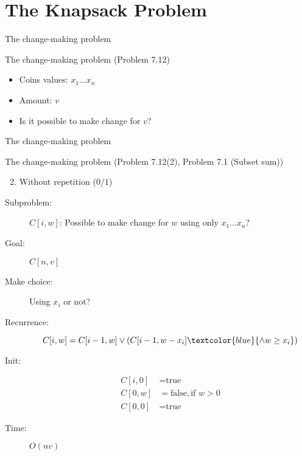 \section{The Knapsack Problem}

\begin{frame}{The change-making problem}
  \begin{exampleblock}{The change-making problem (Problem 7.12)}
    \begin{itemize}
      \item Coins values: $x_{1} \dots x_{n}$
      \item Amount: $v$
      \item Is it possible to make change for $v$?
    \end{itemize}
  \end{exampleblock}
\end{frame}
\begin{frame}{The change-making problem}
  \begin{exampleblock}{The change-making problem (Problem 7.12(2), Problem 7.1 (Subset sum))}
	\begin{enumerate}[(1)]
	  \setcounter{enumi}{1}
	  \item Without repetition ($0/1$)
	\end{enumerate}
  \end{exampleblock}

  \pause
  \begin{description}
	\item[Subproblem:] $C[i, w]$: Possible to make change for $w$ using only $x_{1} \dots x_{n}$?
	\item[Goal:] $C[n,v]$
	  \pause
	\item[Make choice:] Using $x_{i}$ or not?
	\item[Recurrence:] 
	  \[
		C[i,w] = C[i-1, w] \lor (C[i-1, w-x_{i}] \textcolor{blue}{\land w \ge x_{i}})
	  \]
	  \pause
	\item[Init:]
	  \begin{align*}
		C[i,0] &= \text{true}  \\
		C[0,w] &= \text{false}, \text{if } w > 0 \\
		C[0,0] &= \text{true}
	  \end{align*}
	\item[Time:] $O(nv)$
  \end{description}
\end{frame}
